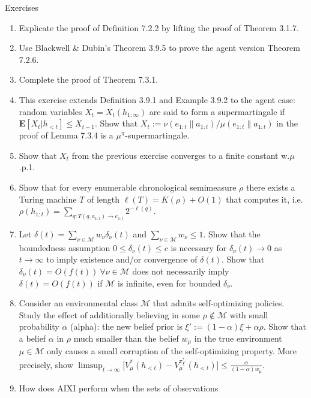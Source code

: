 \documentclass[aspectratio=169,10pt]{beamer}
\newcommand{\Mcal}{\mathcal{M}}
\begin{document}
\begin{frame}[allowframebreaks]{Exercises}
  \small
  \begin{enumerate}
    \item[1.] [C15] Explicate the proof of Definition 7.2.2 by lifting the
      proof of Theorem 3.1.7.
    \item[2.] [C15] Use Blackwell \& Dubin's Theorem 3.9.5 to prove the
      agent version Theorem 7.2.6.
    \item[3.] [C21i] Complete the proof of Theorem 7.3.1.
    \item[4.] [C15i] This exercise extends Definition 3.9.1 and Example
      3.9.2 to the agent case: random variables $X_t=X_t(h_{1:\infty})$ are
      said to form a supermartingale if $\mathbf{E}[X_t|h_{<t}]\le X_{t-1}$.
      Show that $X_t := \nu(e_{1:t}\|a_{1:t})/\mu(e_{1:t}\|a_{1:t})$ in the
      proof of Lemma 7.3.4 is a $\mu^\pi$-supermartingale.
    \item[5.] [C30m] Show that $X_t$ from the previous exercise converges
      to a finite constant w.$\mu$.p.1.
    \item[6.] [C30u] Show that for every enumerable chronological
      semimeasure $\rho$ there exists a Turing machine $T$ of length
      $\ell(T)=K(\rho)+O(1)$ that computes it, i.e.\
      $\rho(h_{1:t}) = \sum_{q:T(q,a_{1:t})\to e_{1:t}}2^{-\ell(q)}$.
    \item[7.] [C20u] Let $\delta(t)=\sum_{\nu\in\Mcal}w_\nu\delta_\nu(t)$
      and $\sum_{\nu\in\Mcal}w_\nu\le1$. Show that the boundedness
      assumption $0\le\delta_\nu(t)\le c$ is necessary for $\delta_\nu(t)\to0$
      as $t\to\infty$ to imply existence and/or convergence of $\delta(t)$.
      Show that $\delta_\nu(t)=O(f(t))\ \forall\nu\in\Mcal$ does not
      necessarily imply $\delta(t)=O(f(t))$ if $\Mcal$ is infinite, even for
      bounded $\delta_\nu$.
    \item[8.] [C30ui] Consider an environmental class $\Mcal$ that admits
      self-optimizing policies. Study the effect of additionally believing
      in some $\rho\notin\Mcal$ with small probability $\alpha$ (alpha): the
      new belief prior is $\xi':=(1-\alpha)\xi+\alpha\rho$. Show that a
      belief $\alpha$ in $\rho$ much smaller than the belief $w_\mu$ in the
      true environment $\mu\in\Mcal$ only causes a small corruption of the
      self-optimizing property. More precisely, show
      $\limsup_{t\to\infty}\big[V_\mu^*(h_{<t}) - V_\mu^{\pi_{\xi'}^*}(h_{<t})\big]
      \le \frac{\alpha}{(1-\alpha)w_\mu}$.
    \item[9.] [C40o] How does AIXI perform when the sets of observations

\end{enumerate}
\end{frame}
\end{document}

